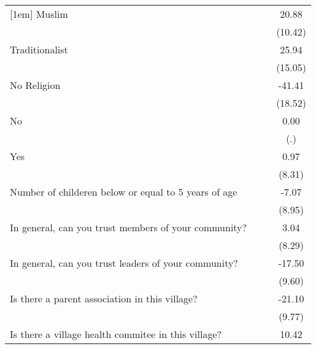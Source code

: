 {\begin{tabular}{l*{3}{c}}
[1em]
Muslim              &                     &                     &       20.88\sym{*}  \\
                    &                     &                     &     (10.42)         \\
[1em]
Traditionalist      &                     &                     &       25.94         \\
                    &                     &                     &     (15.05)         \\
[1em]
No Religion         &                     &                     &      -41.41\sym{*}  \\
                    &                     &                     &     (18.52)         \\
[1em]
No                  &                     &                     &        0.00         \\
                    &                     &                     &         (.)         \\
[1em]
Yes                 &                     &                     &        0.97         \\
                    &                     &                     &      (8.31)         \\
[1em]
Number of childeren below or equal to 5 years of age&                     &                     &       -7.07         \\
                    &                     &                     &      (8.95)         \\
[1em]
In general, can you trust members of your community?&                     &                     &        3.04         \\
                    &                     &                     &      (8.29)         \\
[1em]
In general, can you trust leaders of your community?&                     &                     &      -17.50         \\
                    &                     &                     &      (9.60)         \\
[1em]
Is there a parent association in this village?&                     &                     &      -21.10\sym{*}  \\
                    &                     &                     &      (9.77)         \\
[1em]
Is there a village health commitee in this village?&                     &                     &       10.42         \\

\end{tabular}}
